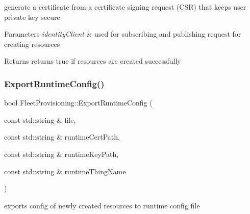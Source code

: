 generate a certificate from a certificate signing request (C\+SR) that keeps user private key secure 


\begin{DoxyParams}{Parameters}
{\em identity\+Client} & used for subscribing and publishing request for creating resources \\
\hline
\end{DoxyParams}
\begin{DoxyReturn}{Returns}
returns true if resources are created successfully 
\end{DoxyReturn}
\mbox{\label{class_aws_1_1_iot_1_1_device_client_1_1_fleet_provisioning_a6f4e107e4d2858f51603eec2f390aa96}} 
\subsubsection{\texorpdfstring{Export\+Runtime\+Config()}{ExportRuntimeConfig()}}
{\footnotesize\ttfamily bool Fleet\+Provisioning\+::\+Export\+Runtime\+Config (\begin{DoxyParamCaption}\item[{const std\+::string \&}]{file,  }\item[{const std\+::string \&}]{runtime\+Cert\+Path,  }\item[{const std\+::string \&}]{runtime\+Key\+Path,  }\item[{const std\+::string \&}]{runtime\+Thing\+Name }\end{DoxyParamCaption})\hspace{0.3cm}{\ttfamily [private]}}



exports config of newly created resources to runtime config file 



